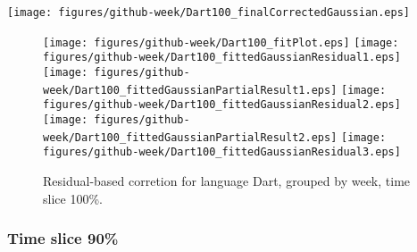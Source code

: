 \begin{center}
{\texttt{[image: figures/github-week/Dart100\_finalCorrectedGaussian.eps]}}
\end{center}

\FloatBarrier

\begin{figure}[t]
\centering
{}
{\texttt{[image: figures/github-week/Dart100\_fitPlot.eps]}}
{\texttt{[image: figures/github-week/Dart100\_fittedGaussianResidual1.eps]}}
{\texttt{[image: figures/github-week/Dart100\_fittedGaussianPartialResult1.eps]}}
{\texttt{[image: figures/github-week/Dart100\_fittedGaussianResidual2.eps]}}
{\texttt{[image: figures/github-week/Dart100\_fittedGaussianPartialResult2.eps]}}
{\texttt{[image: figures/github-week/Dart100\_fittedGaussianResidual3.eps]}}
\caption{Residual-based corretion for language Dart, grouped by week, time slice 100\%.}
\end{figure}


\FloatBarrier


\subsubsection{Time slice 90\%}

